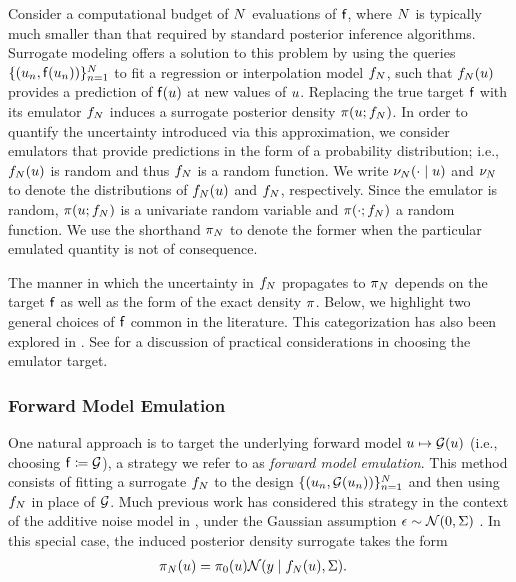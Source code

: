 \documentclass[12pt]{article}
\begin{document}
Consider a computational budget of $N$ evaluations of $\mathsf{f}$, where 
$N$ is typically much smaller than that required by standard posterior
inference algorithms. Surrogate modeling offers a solution to this problem 
by using the queries $\{(u_n, \mathsf{f}(u_n))\}_{n=1}^{N}$ to 
fit a regression or interpolation model $f_{N}$, such that $f_{N}(u)$
provides a prediction of $\mathsf{f}(u)$ at new values of $u$.
Replacing the true target $\mathsf{f}$ with its emulator $f_{N}$ induces a 
surrogate posterior density $\pi(u; f_{N})$. In order to quantify
the uncertainty introduced via this approximation, we consider emulators 
that provide predictions in the form of a probability distribution; 
i.e., $f_{N}(u)$ is random and thus $f_{N}$ is a random function. 
We write $\nu_{N}(\cdot \mid u)$ and $\nu_{N}$ to denote the distributions
of $f_{N}(u)$ and $f_{N}$, respectively. Since the emulator is random, 
$\pi(u; f_{N})$ is a univariate random variable and 
$\pi(\cdot; f_{N})$ a random 
function. We use the shorthand $\pi_{N}$ to denote the former when the particular 
emulated quantity is not of consequence.

The manner in which the uncertainty in $f_{N}$ propagates to $\pi_{N}$
depends on the target $\mathsf{f}$ as well as the form of the exact density 
$\pi$. Below, we highlight two general choices of $\mathsf{f}$ common 
in the literature. This categorization has also 
been explored in \citet{StuartTeck1,StuartTeck2,GP_PDE_priors}. See
\citet{reviewPaper} for a discussion of practical considerations in choosing 
the emulator target. 

\subsubsection{Forward Model Emulation}
One natural approach is to target the underlying forward model 
$u \mapsto \mathcal{G}(u)$ (i.e., choosing $\mathsf{f} \coloneqq \mathcal{G}$), a strategy 
we refer to as \textit{forward model emulation}.
This method consists of fitting a surrogate $f_{N}$ to the design 
$\{(u_n, \mathcal{G}(u_n))\}_{n=1}^{N}$ and then using $f_{N}$
in place of $\mathcal{G}$. Much previous work has considered this strategy 
in the context of the additive noise model in ,
under the Gaussian assumption $\epsilon \sim \mathcal{N}(0, \Sigma)$
\citep{StuartTeck1,GP_PDE_priors,hydrologicalModel,hydrologicalModel2,
Surer2023sequential,VillaniAdaptiveGP,weightedIVAR,idealizedGCM,CES}.
In this special case, the induced posterior density surrogate takes the form
\begin{align}
\pi_{N}(u) &= \pi_0(u) \mathcal{N}(y \mid f_{N}(u), \Sigma). \label{eq:post-em-fwd-Gaussian}
\end{align}
\end{document}
